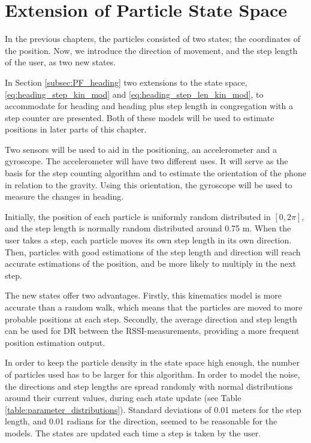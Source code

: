 \documentclass{LTHthesis}
\begin{document}
\section{Extension of Particle State Space}

In the previous chapters, the particles consisted of two states; the coordinates of the position. Now, we introduce the direction of movement, and the step length of the user, as two new states. 

In Section \ref{subsec:PF_heading} two extensions to the state space, \ref{eq:heading_step_kin_mod} and \ref{eq:heading_step_len_kin_mod}, to accommodate for heading and heading plus step length in congregation with a step counter are presented. Both of these models will be used to estimate positions in later parts of this chapter.

Two sensors will be used to aid in the positioning, an accelerometer and a gyroscope. The accelerometer will have two different uses. It will serve as the basis for the step counting algorithm and to estimate the orientation of the phone in relation to the gravity. Using this orientation, the gyroscope will be used to measure the changes in heading.  

Initially, the position of each particle is uniformly random distributed in $[0,2\pi]$, and the step length is normally random distributed around 0.75 m. When the user takes a step, each particle moves its own step length in its own direction. Then, particles with good estimations of the step length and direction will reach accurate estimations of the position, and be more likely to multiply in the next step.

The new states offer two advantages. Firstly, this kinematics model is more accurate than a random walk, which means that the particles are moved to more probable positions at each step. Secondly, the average direction and step length can be used for DR between the RSSI-measurements, providing a more frequent position estimation output.

In order to keep the particle density in the state space high enough, the number of particles used has to be larger for this algorithm. In order to model the noise, the directions and step lengths are spread randomly with normal distributions around their current values, during each state update (see Table \ref{table:parameter_distributions}). Standard deviations of 0.01 meters for the step length, and 0.01 radians for the direction, seemed to be reasonable for the models. The states are updated each time a step is taken by the user. 
\end{document}
